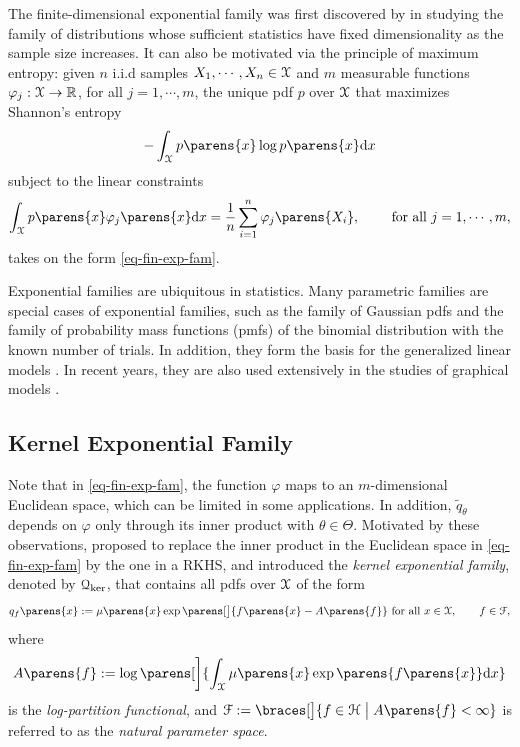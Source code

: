 The finite-dimensional exponential family was first discovered by \textcite{Darmois1935-yz, Koopman1936-fb, Pitman1936-cl} in studying the family of distributions whose sufficient statistics have fixed dimensionality as the sample size increases. It can also be motivated via the principle of maximum entropy: given $n$ i.i.d samples $X_1, \cdots, X_n \in \mathcal{X}$ and $m$ measurable functions $\varphi_j: \mathcal{X} \to \mathbb{R}$, for all $j = 1, \cdots, m$, the unique pdf $p$ over $\mathcal{X}$ that maximizes Shannon's entropy 
\begin{align*}
	- \int_{\calX} p \parens{x} \log p \parens{x} \diff x 
\end{align*}
subject to the linear constraints 
\begin{align*}
	\int_{\calX} p \parens{x} \varphi_j \parens{x} \diff x = \frac{1}{n} \sum_{i=1}^n \varphi_j \parens{X_i}, \qquad \text{ for all } j = 1, \cdots, m, 
\end{align*}
takes on the form \eqref{eq-fin-exp-fam}. 

Exponential families are ubiquitous in statistics. Many parametric families are special cases of exponential families, such as the family of Gaussian pdfs and the family of probability mass functions (pmfs) of the binomial distribution with the known number of trials. In addition, they form the basis for the generalized linear models \parencite{mccullagh1989generalized}. In recent years, they are also used extensively in the studies of graphical models \parencite{Wainwright2008-tp}. 

\subsection{Kernel Exponential Family}

Note that in \eqref{eq-fin-exp-fam}, the function $\varphi$ maps to an $m$-dimensional Euclidean space, which can be limited in some applications. In addition, $\tilde{q}_{\theta}$ depends on $\varphi$ only through its inner product with $\theta \in \Theta$. Motivated by these observations, \textcite{Canu2006-ig} proposed to replace the inner product in the Euclidean space in \eqref{eq-fin-exp-fam} by the one in a RKHS, and introduced the \textit{kernel exponential family}, denoted by $\mathcal{Q}_{\ker}$, that contains all pdfs over $\mathcal{X}$ of the form 
\begin{align}\label{eq-kernel-exp-fam}
	q_f \parens{x} := \mu \parens{x} \exp \parens[\big]{ f \parens{x} - A \parens{f}} \text{ for all } x \in \calX, \qquad f \in \calF,  
\end{align}
where 
\begin{align}\label{eq-log-partition-fun-kerexpfam}
	A \parens{f} := \log \parens[\bigg]{\int_{\calX} \mu \parens{x} \exp \parens{ f \parens{x} } \diff x}
\end{align}
is the \textit{log-partition functional}, and $\calF := \braces[\big]{f \in \calH \bigm| A \parens{f} < \infty}$ is referred to as the \textit{natural parameter space}. 

